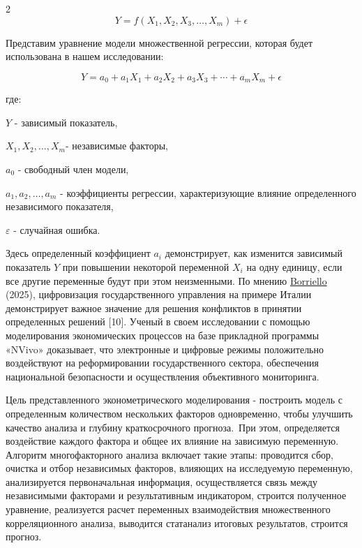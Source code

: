 \begin{multicols}{2}
\begin{equation}
Y = f(X_{1}, X_{2}, X_{3}, \ldots, X_{m}) + \epsilon
\end{equation}

Представим уравнение модели множественной регрессии, которая будет
использована в нашем исследовании:

\begin{equation}
Y = a_{0} + a_{1}X_{1} + a_{2}X_{2} + a_{3}X_{3} + \cdots + a_{m}X_{m} + \epsilon
\end{equation}

где:

\(Y\) - зависимый показатель,

\(X_{1}, X_{2}, \ldots, X_{m}\)- независимые факторы,

\(a_0\) - свободный член модели,

\(a_{1}, a_{2}, \ldots, a_{m}\) - коэффициенты регрессии, характеризующие влияние
определенного независимого показателя,

\(\varepsilon\) - случайная ошибка.

Здесь определенный коэффициент \(a_i\) демонстрирует, как изменится
зависимый показатель \(Y\) при повышении некоторой переменной
\(X_i\) на одну единицу, если все другие переменные будут при этом
неизменными. По мнению
\href{https://journals.sagepub.com/doi/10.1177/00208523251333541\#con}{Borriello}
(2025), цифровизация государственного управления на примере Италии
демонстрирует важное значение для решения конфликтов в принятии
определенных решений {[}10{]}. Ученый в своем исследовании с помощью
моделирования экономических процессов на базе прикладной программы
«NVivo» доказывает, что электронные и цифровые режимы положительно
воздействуют на реформировании государственного сектора, обеспечения
национальной безопасности и осуществления объективного мониторинга.

Цель представленного эконометрического моделирования - построить модель
с определенным количеством нескольких факторов одновременно, чтобы
улучшить качество анализа и глубину краткосрочного прогноза.~При этом,
определяется воздействие каждого фактора и общее их влияние на зависимую
переменную. Алгоритм многофакторного анализа включает такие этапы:
проводится сбор, очистка и отбор независимых факторов, влияющих на
исследуемую переменную, анализируется первоначальная информация,
осуществляется связь между независимыми факторами и результативным
индикатором, строится полученное уравнение, реализуется расчет
переменных взаимодействия множественного корреляционного анализа,
выводится статанализ итоговых результатов, строится прогноз.


\end{multicols}

